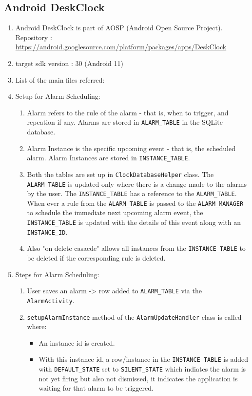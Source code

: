 \documentclass{article}
\begin{document}
\subsection{Android DeskClock}
\begin{enumerate}
    \item Android DeskClock is part of AOSP (Android Open Source Project). Repository : \url{https://android.googlesource.com/platform/packages/apps/DeskClock}
    \item target sdk version : 30 (Android 11)
    \item List of the main files referred: 
    \item Setup for Alarm Scheduling:
    \begin{enumerate}
        \item Alarm refers to the rule of the alarm - that is, when to trigger, and repeation if any. Alarms are stored in \texttt{ALARM\_TABLE} in the SQLite database.
        \item Alarm Instance is the specific upcoming event - that is, the scheduled alarm. Alarm Instances are stored in \texttt{INSTANCE\_TABLE}. 
        \item Both the tables are set up in \texttt{ClockDatabaseHelper} class. 
        The \texttt{ALARM\_TABLE} is updated only where there is a change made to the alarms by the user. 
        The \texttt{INSTANCE\_TABLE} has a reference to the \texttt{ALARM\_TABLE}. 
        When ever a rule from the \texttt{ALARM\_TABLE} is passed to the \texttt{ALARM\_MANAGER} to schedule the immediate next upcoming alarm event, 
        the \texttt{INSTANCE\_TABLE} is updated with the details of this event along with an \texttt{INSTANCE\_ID}.
        \item Also "on delete casacde" allows all instances from the \texttt{INSTANCE\_TABLE} to be deleted if the corresponding rule is deleted.
    \end{enumerate}
    \item Steps for Alarm Scheduling:
    \begin{enumerate}
        \item User saves an alarm -> row added to \texttt{ALARM\_TABLE} via the \texttt{AlarmActivity}.
        \item \texttt{setupAlarmInstance} method of the \texttt{AlarmUpdateHandler} class is called where:
        \begin{itemize}
            \item An instance id is created.
            \item With this instance id, a row/instance in the \texttt{INSTANCE\_TABLE} is added with \texttt{DEFAULT\_STATE} set to \texttt{SILENT\_STATE} which indiates the alarm is not yet firing but also not dismissed, it indicates the application is waiting for that alarm to be triggered.


\end{itemize}
\end{enumerate}
\end{enumerate}
\end{document}
